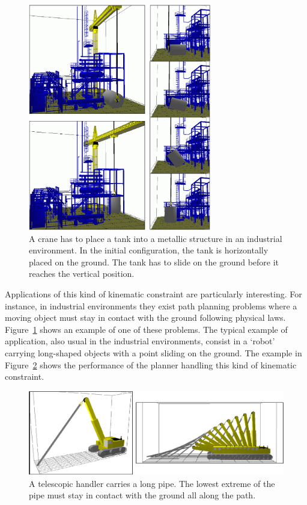 \begin{figure}[ht!]
\begin{center}
  \includegraphics[width=8.0cm]{FIG/Constraint/grue.eps}
\end{center}
\caption{\label{fig:gruaind} A crane has to place a tank into a
metallic structure in an industrial environment. In the initial
configuration, the tank is horizontally placed on the ground. The tank
has to slide on the ground before it reaches the vertical position.}
\end{figure}

Applications of this kind of kinematic constraint are particularly
interesting. For instance, in industrial environments they exist path
planning problems where a moving object must stay in contact with the
ground following physical laws. Figure~\ref{fig:gruaind} shows an
example of one of these problems. The typical example of application,
also usual in the industrial environments, consist in a `robot'
carrying long-shaped objects with a point sliding on the ground. The
example in Figure~\ref{fig:pipe} shows the performance of the planner
handling this kind of kinematic constraint.

\begin{figure}[ht!]
\centerline{
\includegraphics[width=15cm]{FIG/Constraint/pipe12.eps}
}
\caption{\label{fig:pipe} A telescopic handler carries a long
pipe. The lowest extreme of the pipe must stay in contact with the
ground all along the path.}
\end{figure}

